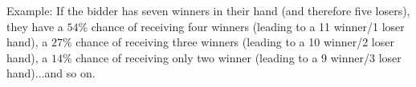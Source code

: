 \documentclass[11pt]{article}
\begin{document}
Example: If the bidder has seven winners in their hand (and therefore five losers), they have a $54\%$ chance of receiving four winners (leading to a 11 winner/1 loser hand), a $27\%$ chance of receiving three winners (leading to a 10 winner/2 loser hand), a $14\%$ chance of receiving only two winner (leading to a 9 winner/3 loser hand)...and so on.  
\end{document}
